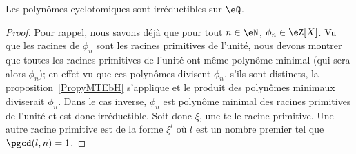 \begin{proposition}      \label{PropoIeOVh}
    Les polynômes cyclotomiques sont irréductibles sur \( \eQ\).
\end{proposition}

\begin{proof}
    Pour rappel, nous savons déjà que pour tout \( n\in\eN\), \( \phi_n\in \eZ[X]\). Vu que les racines de \( \phi_n\) sont les racines primitives de l'unité, nous devons montrer que toutes les racines primitives de l'unité ont même polynôme minimal (qui sera alors \( \phi_n\)); en effet vu que ces polynômes divisent \( \phi_n\), s'ils sont distincts, la proposition~\ref{PropyMTEbH} s'applique et le produit des polynômes minimaux diviserait \( \phi_n\). Dans le cas inverse, \( \phi_n\) est polynôme minimal des racines primitives de l'unité et est donc irréductible. Soit donc \( \xi\), une telle racine primitive. Une autre racine primitive est de la forme \( \xi^l\) où \( l\) est un nombre premier tel que \( \pgcd(l,n)=1\).


\end{proof}
